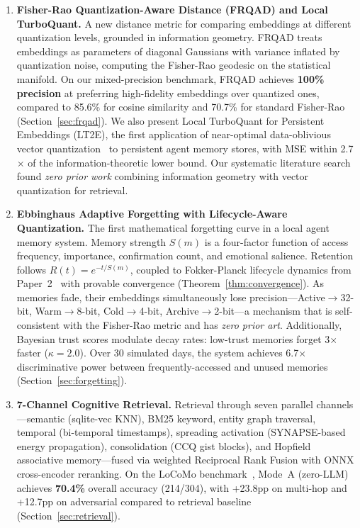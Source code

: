 \begin{enumerate}[leftmargin=*, label=\textbf{C\arabic*}, topsep=4pt, itemsep=2pt]

  \item \textbf{Fisher-Rao Quantization-Aware Distance (FRQAD) and Local TurboQuant.}
  A new distance metric for comparing embeddings at different quantization levels, grounded in information geometry. FRQAD treats embeddings as parameters of diagonal Gaussians with variance inflated by quantization noise, computing the Fisher-Rao geodesic on the statistical manifold. On our mixed-precision benchmark, FRQAD achieves \textbf{100\% precision} at preferring high-fidelity embeddings over quantized ones, compared to 85.6\% for cosine similarity and 70.7\% for standard Fisher-Rao (Section~\ref{sec:frqad}). We also present Local TurboQuant for Persistent Embeddings (LT2E), the first application of near-optimal data-oblivious vector quantization~\cite{turboquant} to persistent agent memory stores, with MSE within 2.7$\times$ of the information-theoretic lower bound. Our systematic literature search found \emph{zero prior work} combining information geometry with vector quantization for retrieval.

  \item \textbf{Ebbinghaus Adaptive Forgetting with Lifecycle-Aware Quantization.}
  The first mathematical forgetting curve in a local agent memory system. Memory strength $S(m)$ is a four-factor function of access frequency, importance, confirmation count, and emotional salience. Retention follows $R(t) = e^{-t/S(m)}$, coupled to Fokker-Planck lifecycle dynamics from Paper~2~\cite{slm-paper2} with provable convergence (Theorem~\ref{thm:convergence}). As memories fade, their embeddings simultaneously lose precision---Active$\to$32-bit, Warm$\to$8-bit, Cold$\to$4-bit, Archive$\to$2-bit---a mechanism that is self-consistent with the Fisher-Rao metric and has \emph{zero prior art}. Additionally, Bayesian trust scores modulate decay rates: low-trust memories forget 3$\times$ faster ($\kappa = 2.0$). Over 30 simulated days, the system achieves 6.7$\times$ discriminative power between frequently-accessed and unused memories (Section~\ref{sec:forgetting}).

  \item \textbf{7-Channel Cognitive Retrieval.}
  Retrieval through seven parallel channels---semantic (sqlite-vec KNN), BM25 keyword, entity graph traversal, temporal (bi-temporal timestamps), spreading activation (SYNAPSE-based~\cite{synapse} energy propagation), consolidation (CCQ gist blocks), and Hopfield associative memory---fused via weighted Reciprocal Rank Fusion with ONNX cross-encoder reranking. On the LoCoMo benchmark~\cite{locomo}, Mode~A (zero-LLM) achieves \textbf{70.4\%} overall accuracy (214/304), with +23.8pp on multi-hop and +12.7pp on adversarial compared to retrieval baseline (Section~\ref{sec:retrieval}).


\end{enumerate}
